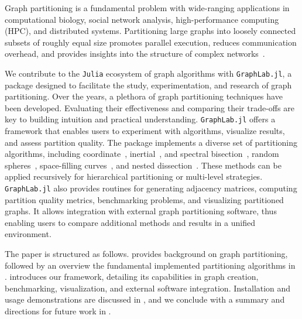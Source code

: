 \documentclass[../paper.tex]{subfiles}
\begin{document}
    Graph partitioning is a fundamental problem with wide-ranging
    applications in computational biology, social network
    analysis, high-performance computing (HPC), and distributed
    systems. Partitioning large graphs into loosely connected
    subsets of roughly equal size promotes parallel execution,
    reduces communication overhead, and provides insights into the
    structure of complex networks~\cite{MoreRecentAdvances}.

    We contribute to the \texttt{Julia} ecosystem of graph algorithms with
    \texttt{GraphLab.jl}, a package designed to
    facilitate the study, experimentation, and research
    of graph partitioning.
    Over the years, a plethora of graph partitioning
    techniques have been developed. Evaluating their
    effectiveness and comparing their trade-offs are key
    to building intuition and practical understanding.
    \texttt{GraphLab.jl} offers a framework
    that enables users to experiment with algorithms, 
    visualize results, and assess partition quality. The
    package implements a diverse set of partitioning
    algorithms, including
    coordinate~\cite{Simon91}, inertial~\cite{farhat1993automatic}, and
    spectral bisection~\cite{fiedler75,Simon91}, random spheres~\cite{doi:10.1137/S1064827594275339}, space-filling
    curves~\cite{Sasidharan15}, and nested dissection~\cite{George73}. These methods can be applied
    recursively for hierarchical partitioning or multi-level strategies. \texttt{GraphLab.jl} also
    provides routines for generating adjacency matrices, computing partition quality metrics,
    benchmarking problems, and visualizing partitioned graphs. It allows integration with external
    graph partitioning software, thus enabling users to compare additional methods and results in a
    unified environment.

    
    The paper is structured as follows.  provides background on graph
    partitioning, followed by an overview the fundamental
    implemented partitioning algorithms in .
     introduces our framework, detailing its capabilities in graph creation,
    benchmarking, visualization, and external software integration. Installation and usage
    demonstrations are discussed in , and we conclude with a summary
    and directions for future work in .
\end{document}
